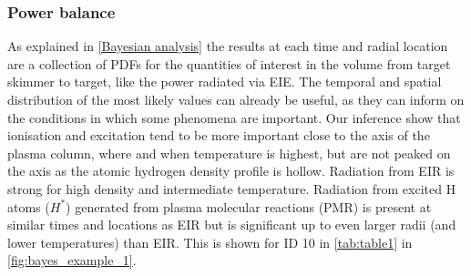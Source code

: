 \subsubsection{Power balance}\label{Power balance bayesian}
As explained in \autoref{Bayesian analysis} the results at each time and radial location are a collection of PDFs for the quantities of interest in the volume from target skimmer to target, like the power radiated via EIE. The temporal and spatial distribution of the most likely values can already be useful, as they can inform on the conditions in which some phenomena are important. Our inference show that ionisation and excitation tend to be more important close to the axis of the plasma column, where and when temperature is highest, but are not peaked on the axis as the atomic hydrogen density profile is hollow. Radiation from EIR is strong for high density and intermediate temperature. Radiation from excited H atoms ($H^*$) generated from plasma molecular reactions (PMR) is present at similar times and locations as EIR but is significant up to even larger radii (and lower temperatures) than EIR. This is shown for ID 10 in \autoref{tab:table1} in \autoref{fig:bayes_example_1}.

